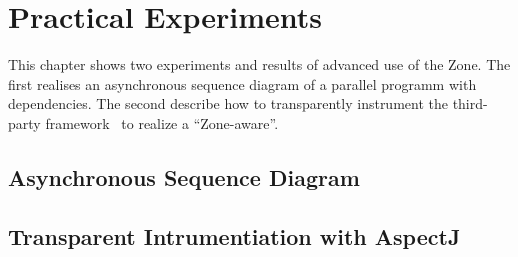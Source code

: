 
\chapter{Practical Experiments}
\label{ch:inpractice}

This chapter shows two experiments and results of advanced use of the Zone. The first realises an asynchronous sequence diagram of a parallel programm with dependencies. The second describe how to transparently instrument the third-party framework \vertx\ to realize a ``Zone-aware\vertx''.

\section{Asynchronous Sequence Diagram}

\section{Transparent Intrumentiation with AspectJ}



